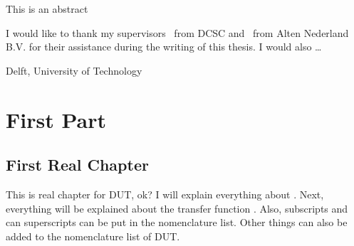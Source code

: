 \documentclass[a4paper,11pt]{mscThesis}
\begin{document}
%
\frontmatter %
%
 \maketitle
%

    This is an abstract
    \cleardoublepage
%

    I would like to thank my supervisors \mscreaderone\ from DCSC and \mscreadertwo\ from Alten Nederland B.V. for their assistance during the writing
    of this thesis. I would also \ldots
    \vspace*{15mm}

    \noindent
    Delft, University of Technology \hfill \mscname\\
    \mscdate

%
    \tocloflot
%
    \printnomencl %
%
    \begin{acronym}[XXXXX]%
    \end{acronym}%
    \cleardoublepage%
%
    \printindex%
    \cleardoublepage%
%
%
\mainmatter
%


%
    \part{First Part}

    \chapter{First Real Chapter}

    This is real chapter for \ac{DUT}, ok? I will explain everything about . Next, everything
    will be explained about the transfer function . Also, subscripts and can
    superscripts can be put in the nomenclature  list.   Other things can also
    be added to the nomenclature list of \ac{DUT}.  
\end{document}
